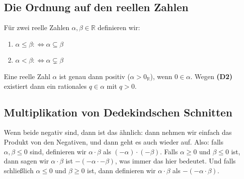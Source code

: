 \subsection{Die Ordnung auf den reellen Zahlen}
\begin{math-stroke}
\begin{definition}\label{def:ordnung-reell}
Für zwei reelle Zahlen $\alpha, \beta \in \mathbb{R}$ definieren wir:
\begin{enumerate}[label=\textbf{(\roman*)}]
    \item $\alpha \le \beta :\iff \alpha \subseteq \beta$
    \item $\alpha < \beta :\iff \alpha \subsetneq \beta$
\end{enumerate}
\end{definition}

\begin{remark}[Positivität]
\label{rem:positivitaet}
Eine reelle Zahl $\alpha$ ist genau dann positiv ($\alpha > 0_{\mathbb{R}}$), wenn $0 \in \alpha$. Wegen \textbf{(D2)} existiert dann ein rationales $q \in \alpha$ mit $q > 0$.
\end{remark}
\end{math-stroke}

\subsection{Multiplikation von Dedekindschen Schnitten}

\begin{spoken-clean}[01:07:15 - 01:10:00]
Wenn beide negativ sind, dann ist das ähnlich: dann nehmen wir einfach das Produkt von den Negativen, und dann geht es auch wieder auf. Also: falls $\alpha, \beta \le 0$ sind, definieren wir $\alpha \cdot \beta$ als $(-\alpha) \cdot (-\beta)$. Falls $\alpha \ge 0$ und $\beta \le 0$ ist, dann sagen wir $\alpha \cdot \beta$ ist $-(-\alpha \cdot -\beta)$, was immer das hier bedeutet. Und falls schließlich $\alpha \le 0$ und $\beta \ge 0$ ist, dann definieren wir $\alpha \cdot \beta$ als $-(-\alpha \cdot \beta)$.
\end{spoken-clean}

